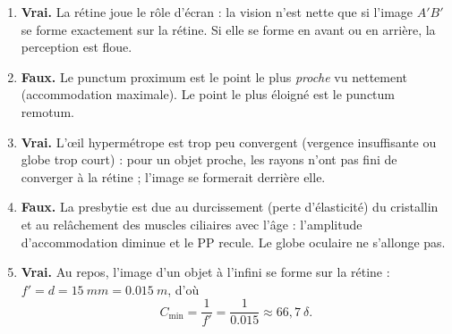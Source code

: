 \documentclass[11pt]{article}
\begin{document}
\begin{corrige}
\begin{enumerate}
\item \textbf{Vrai.} La rétine joue le rôle d'écran : la vision n'est nette que si l'image $A'B'$ se forme exactement sur la rétine. Si elle se forme en avant ou en arrière, la perception est floue.
\item \textbf{Faux.} Le punctum proximum est le point le plus \emph{proche} vu nettement (accommodation maximale). Le point le plus éloigné est le punctum remotum.
\item \textbf{Vrai.} L'œil hypermétrope est trop peu convergent (vergence insuffisante ou globe trop court) : pour un objet proche, les rayons n'ont pas fini de converger à la rétine ; l'image se formerait derrière elle.
\item \textbf{Faux.} La presbytie est due au durcissement (perte d'élasticité) du cristallin et au relâchement des muscles ciliaires avec l'âge : l'amplitude d'accommodation diminue et le PP recule. Le globe oculaire ne s'allonge pas.
\item \textbf{Vrai.} Au repos, l'image d'un objet à l'infini se forme sur la rétine : $f' = d = \SI{15}{mm} = \SI{0,015}{m}$, d'où
\[ C_{\min} = \frac{1}{f'} = \frac{1}{\num{0,015}} \approx 66,7\ \delta. \]
\end{enumerate}
\end{corrige}
\end{document}
